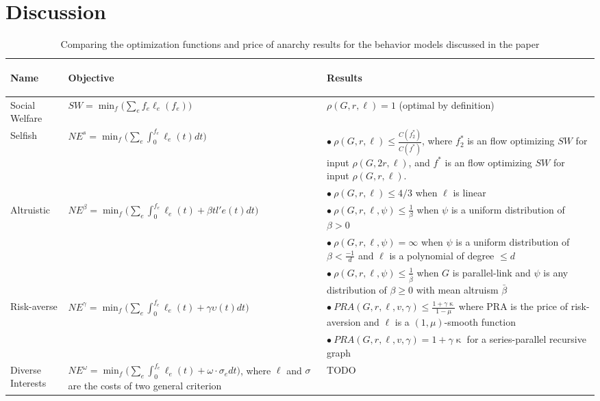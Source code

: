 \section{Discussion}\label{sec:discussion}

\begin{table}[h]
\begin{center}
    \begin{tabular}{|p{2cm}| p{6cm} | p{7cm}|} 
 \hline
        \begin{center}Name\end{center} & \begin{center}Objective\end{center} & \begin{center} Results\end{center} \\
 \hline\hline
        Social Welfare & $SW = \min_f\Big(\sum_e f_e\ell_e(f_e)\Big)$ & $\rho(G,r,\ell) = 1$ (optimal by definition) \\
 \hline
     Selfish & $NE^s = \min_f\Big(\sum_e\int_0^{f_e} \ell_e(t)dt\Big)$ & 
        $\bullet~\rho(G,r,\ell) \le \frac{C(f^*_2)}{C(f^*)}$, where $f^*_2$ is an flow optimizing $SW$ for input $\rho(G,2r,\ell)$, and $f^*$ is an flow optimizing $SW$ for input $\rho(G,r,\ell)$.\\ 
        &  & $\bullet~\rho(G,r,\ell) \le 4/3$ when $\ell$ is linear\\
 \hline
        Altruistic & $NE^\beta = \min_f\Big(\sum_e\int_0^{f_e} \ell_e(t) + \beta tl'e(t)dt\Big)$ & 
        $\bullet~\rho(G,r,\ell,\psi) \le \frac{1}{\beta}$ when $\psi$ is a uniform distribution of $\beta >0$\\
        & & $\bullet~\rho(G,r,\ell,\psi) = \infty$ when $\psi$ is a uniform distribution of $\beta < \frac{-1}{d}$ and $\ell$ is a polynomial of degree $\le d$\\
        & & $\bullet~\rho(G,r,\ell,\psi) \le \frac{1}{\bar{\beta}}$ when $G$ is parallel-link and $\psi$ is any distribution of $\beta \ge 0$ with mean altruism $\bar{\beta}$\\
\hline
     Risk-averse & $NE^\gamma = \min_f\Big(\sum_e\int_0^{f_e} \ell_e(t) + \gamma\upsilon(t)dt\Big)$ & 
    $\bullet~PRA(G,r,\ell,v,\gamma) \leq \frac{1 + \gamma\upkappa}{1 - \mu}$ where PRA is the price of risk-aversion and $\ell$ is a $(1,\mu)$-smooth function\\
    & & $\bullet~PRA(G,r,\ell,v,\gamma) = 1 + \gamma\upkappa $ for a series-parallel recursive graph\\

    
\hline
     Diverse Interests & $NE^\omega = \min_f\Big(\sum_e\int_0^{f_e} \ell_e(t) + \omega\cdot \sigma_e dt\Big)$, where $\ell$ and $\sigma$ are the costs of two general criterion & TODO\\
\hline
\end{tabular}
\end{center}
    \caption{Comparing the optimization functions and price of anarchy results for the behavior models discussed in the paper}
    \label{tab:comparison}
\end{table}
